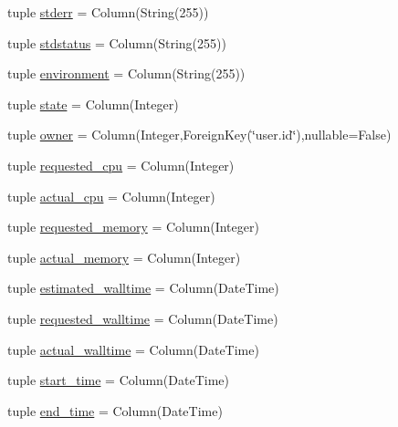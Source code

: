 \begin{DoxyCompactItemize}
\item 
tuple \hyperlink{classcyberweb_1_1model_1_1job_1_1_task_a317b91a9d142dd5900dad3955dba4b4f}{stderr} = \-Column(\-String(255))
\item 
tuple \hyperlink{classcyberweb_1_1model_1_1job_1_1_task_a9167d534f095d119a5d463085f89f4a8}{stdstatus} = \-Column(\-String(255))
\item 
tuple \hyperlink{classcyberweb_1_1model_1_1job_1_1_task_af1ccaa981c0cdb099f87f5b305b06247}{environment} = \-Column(\-String(255))
\item 
tuple \hyperlink{classcyberweb_1_1model_1_1job_1_1_task_a405e4dcfc931e337b341fdaaa2cfd0d6}{state} = \-Column(\-Integer)
\item 
tuple \hyperlink{classcyberweb_1_1model_1_1job_1_1_task_a64a2f4ce7f146ccba86a99f5a32c65e8}{owner} = \-Column(\-Integer,\-Foreign\-Key(\char`\"{}user.\-id\char`\"{}),nullable=\-False)
\item 
tuple \hyperlink{classcyberweb_1_1model_1_1job_1_1_task_af098060cfd5ca4e6d73c325dc2680c8a}{requested\-\_\-cpu} = \-Column(\-Integer)
\item 
tuple \hyperlink{classcyberweb_1_1model_1_1job_1_1_task_ae7ee2403de38a5b0bceec5d1f54d404b}{actual\-\_\-cpu} = \-Column(\-Integer)
\item 
tuple \hyperlink{classcyberweb_1_1model_1_1job_1_1_task_a088ff64f0ccdb1a7ce1e58e34d06cc88}{requested\-\_\-memory} = \-Column(\-Integer)
\item 
tuple \hyperlink{classcyberweb_1_1model_1_1job_1_1_task_a6076c422220095af259ec7e5a0fd0bf8}{actual\-\_\-memory} = \-Column(\-Integer)
\item 
tuple \hyperlink{classcyberweb_1_1model_1_1job_1_1_task_a5a4e64f343d52a75aebf834e64d3175f}{estimated\-\_\-walltime} = \-Column(\-Date\-Time)
\item 
tuple \hyperlink{classcyberweb_1_1model_1_1job_1_1_task_abc34d3a69c5f6ce60b4f5e26bef52708}{requested\-\_\-walltime} = \-Column(\-Date\-Time)
\item 
tuple \hyperlink{classcyberweb_1_1model_1_1job_1_1_task_a7e0aae51b667bdd8a38fb898a089b0e8}{actual\-\_\-walltime} = \-Column(\-Date\-Time)
\item 
tuple \hyperlink{classcyberweb_1_1model_1_1job_1_1_task_aed21bb8ae214e02e15b323e14780b334}{start\-\_\-time} = \-Column(\-Date\-Time)
\item 
tuple \hyperlink{classcyberweb_1_1model_1_1job_1_1_task_a8d26d9c39b4e3dc2466b795db41cad2d}{end\-\_\-time} = \-Column(\-Date\-Time)
\item 

\end{DoxyCompactItemize}
